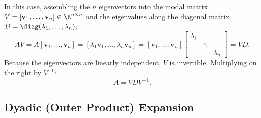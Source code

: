 In this case, assembling the $n$ eigenvectors into the modal matrix $V = [\mathbf{v}_1, \dots, \mathbf{v}_n] \in \R^{n \times n}$ and the eigenvalues along the diagonal matrix $D = \diag(\lambda_1, \dots, \lambda_n)$:
\begin{equation}
    A V = A [\mathbf{v}_1, \dots, \mathbf{v}_n] = [\lambda_1 \mathbf{v}_1, \dots, \lambda_n \mathbf{v}_n] = [\mathbf{v}_1, \dots, \mathbf{v}_n] \begin{bmatrix} \lambda_1 & & \\ & \ddots & \\ & & \lambda_n \end{bmatrix} = V D.
\end{equation}
Because the eigenvectors are linearly independent, $V$ is invertible. Multiplying on the right by $V^{-1}$:
\begin{equation}
    A = V D V^{-1}.
\end{equation}

\subsection{Dyadic (Outer Product) Expansion}

